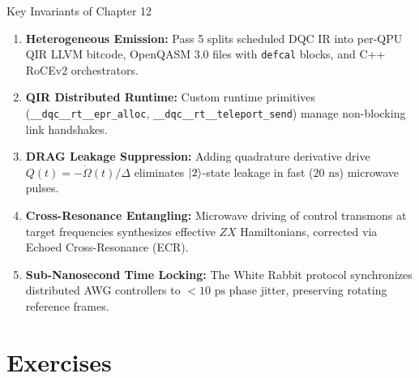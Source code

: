 
\begin{summarybox}{Key Invariants of Chapter 12}
\begin{enumerate}
    \item \textbf{Heterogeneous Emission:} Pass 5 splits scheduled DQC IR into per-QPU QIR LLVM bitcode, OpenQASM 3.0 files with \texttt{defcal} blocks, and C++ RoCEv2 orchestrators.
    \item \textbf{QIR Distributed Runtime:} Custom runtime primitives (\texttt{\_\_dqc\_\_rt\_\_epr\_alloc}, \texttt{\_\_dqc\_\_rt\_\_teleport\_send}) manage non-blocking link handshakes.
    \item \textbf{DRAG Leakage Suppression:} Adding quadrature derivative drive $Q(t) = -\dot{\Omega}(t)/\Delta$ eliminates $\ket{2}$-state leakage in fast ($20\text{ ns}$) microwave pulses.
    \item \textbf{Cross-Resonance Entangling:} Microwave driving of control transmons at target frequencies synthesizes effective $ZX$ Hamiltonians, corrected via Echoed Cross-Resonance (ECR).
    \item \textbf{Sub-Nanosecond Time Locking:} The White Rabbit protocol synchronizes distributed AWG controllers to $<10\text{ ps}$ phase jitter, preserving rotating reference frames.
\end{enumerate}
\end{summarybox}


\section*{Exercises}

